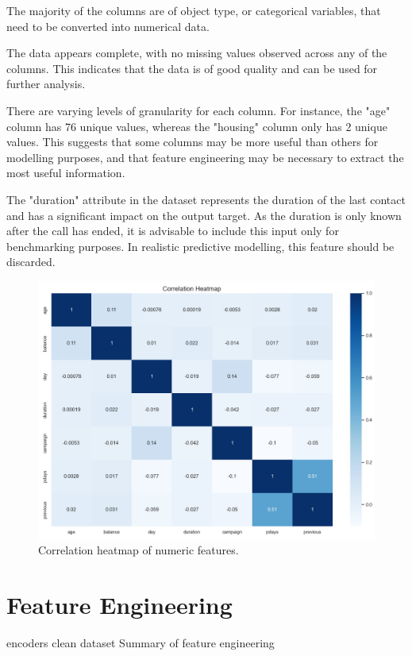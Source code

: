 \documentclass[conference]{IEEEtran}
\begin{document}
The majority of the columns are of object type, or categorical variables, that need to be converted into numerical data.

The data appears complete, with no missing values observed across any of the columns. This indicates that the data is of good quality and can be used for further analysis.

There are varying levels of granularity for each column. For instance, the "age" column has 76 unique values, whereas the "housing" column only has 2 unique values. This suggests that some columns may be more useful than others for modelling purposes, and that feature engineering may be necessary to extract the most useful information.

The "duration" attribute in the dataset represents the duration of the last contact and has a significant impact on the output target. As the duration is only known after the call has ended, it is advisable to include this input only for benchmarking purposes. In realistic predictive modelling, this feature should be discarded.


\begin{figure}[htbp]
\centering
\centerline{\includegraphics[width=1.2\columnwidth] {assets/features/numeric/heat.png}}
\caption{Correlation heatmap of numeric features.}
\label{fig_corr}
\end{figure}

\section{Feature Engineering}
encoders
clean dataset
Summary of feature engineering
\end{document}
